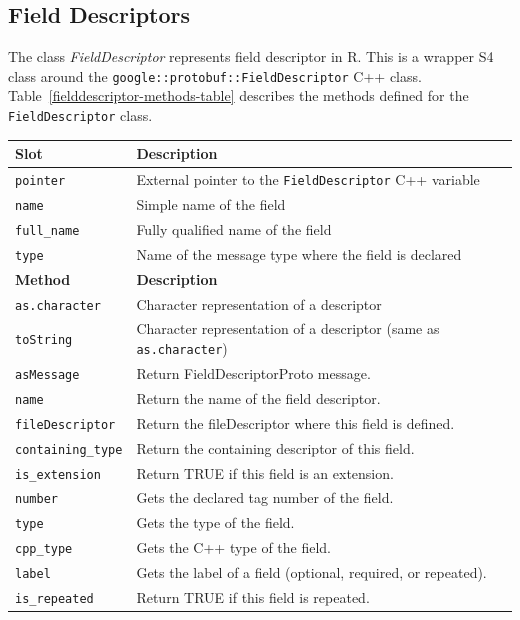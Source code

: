 \documentclass[article]{jss}
\begin{document}
\subsection{Field Descriptors}
\label{subsec-field-descriptor}

The class \emph{FieldDescriptor} represents field
descriptor in R. This is a wrapper S4 class around the
\texttt{google::protobuf::FieldDescriptor} C++ class.
Table~\ref{fielddescriptor-methods-table} describes the methods
defined for the \texttt{FieldDescriptor} class.

\begin{table}[h]
\centering
\begin{small}
\begin{tabular}{l|p{10cm}}
\hline
\textbf{Slot} & \textbf{Description} \\
\hline
\texttt{pointer} & External pointer to the \texttt{FieldDescriptor} C++ variable \\
\hline
\texttt{name} & Simple name of the field \\
\hline
\texttt{full\_name} & Fully qualified name of the field \\
\hline
\texttt{type} & Name of the message type where the field is declared \\[.3cm]
\hline
\textbf{Method} & \textbf{Description} \\
\hline
\texttt{as.character} & Character representation of a descriptor\\
\texttt{toString} & Character
representation of a descriptor (same as \texttt{as.character}) \\
\texttt{asMessage} & Return FieldDescriptorProto message. \\
\texttt{name} & Return the name of the field descriptor.\\
\texttt{fileDescriptor} & Return the fileDescriptor where this field is defined.\\
\texttt{containing\_type} & Return the containing descriptor of this field.\\
\texttt{is\_extension} & Return TRUE if this field is an extension.\\
\texttt{number} & Gets the declared tag number of the field.\\
\texttt{type} & Gets the type of the field.\\
\texttt{cpp\_type} & Gets the C++ type of the field.\\
\texttt{label} & Gets the label of a field (optional, required, or repeated).\\
\texttt{is\_repeated} & Return TRUE if this field is repeated.\\

\end{tabular}
\end{small}
\end{table}
\end{document}
